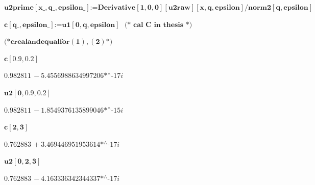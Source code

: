 {\begin{doublespace}
\noindent\(\pmb{\text{u2prime}[\text{x$\_$},\text{q$\_$},\text{epsilon$\_$}]\text{:=}\text{Derivative}[1,0,0][\text{u2raw}][x,q,\text{epsilon}]/\text{norm2}[q,\text{epsilon}]}\)
\end{doublespace}

\begin{doublespace}
\noindent\(\pmb{c[\text{q$\_$},\text{epsilon$\_$}]\text{:=}\text{u1}[0,q,\text{epsilon}]\text{    }\text{(* cal C in thesis *)}}\)
\end{doublespace}

\begin{doublespace}
\noindent\(\pmb{\text{(*} c \text{real} \text{and} \text{equal} \text{for} (1), (2) \text{*)}}\)
\end{doublespace}

\begin{doublespace}
\noindent\(\pmb{c[0.9,0.2]}\)
\end{doublespace}

\begin{doublespace}
\noindent\(0.982811\, -\text{5.4556988634997206$\grave{ }$*${}^{\wedge}$-17} i\)
\end{doublespace}

\begin{doublespace}
\noindent\(\pmb{\text{u2}[0,0.9,0.2]}\)
\end{doublespace}

\begin{doublespace}
\noindent\(0.982811\, -\text{1.8549376135899046$\grave{ }$*${}^{\wedge}$-15} i\)
\end{doublespace}

\begin{doublespace}
\noindent\(\pmb{c[2,3]}\)
\end{doublespace}

\begin{doublespace}
\noindent\(0.762883\, +\text{3.469446951953614$\grave{ }$*${}^{\wedge}$-17} i\)
\end{doublespace}

\begin{doublespace}
\noindent\(\pmb{\text{u2}[0,2,3]}\)
\end{doublespace}

\begin{doublespace}
\noindent\(0.762883\, -\text{4.163336342344337$\grave{ }$*${}^{\wedge}$-17} i\)
\end{doublespace}

}
